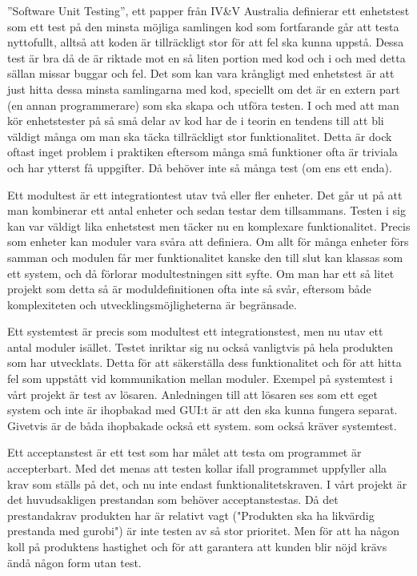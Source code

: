 	''Software Unit Testing'', ett papper från IV\&V Australia definierar ett enhetstest som ett test på den minsta möjliga samlingen kod som fortfarande går att testa nyttofullt, alltså att koden är tillräckligt stor för att fel ska kunna uppstå. Dessa test är bra då de är riktade mot en så liten portion med kod och i och med detta sällan missar buggar och fel. Det som kan vara krångligt med enhetstest är att just hitta dessa minsta samlingarna med kod, speciellt om det är en extern part (en annan programmerare) som ska skapa och utföra testen. I och med att man kör enhetstester på så små delar av kod har de i teorin en tendens till att bli väldigt många om man ska täcka tillräckligt stor funktionalitet. Detta är dock oftast inget problem i praktiken eftersom många små funktioner ofta är triviala och har ytterst få uppgifter. Då behöver inte så många test (om ens ett enda). \newline
	
	Ett modultest är ett integrationtest utav två eller fler enheter. Det går ut på att man kombinerar ett antal enheter och sedan testar dem tillsammans. Testen i sig kan var väldigt lika enhetstest men täcker nu en komplexare funktionalitet. Precis som enheter kan moduler vara svåra att definiera. Om allt för många enheter förs samman och modulen får mer funktionalitet kanske den till slut kan klassas som ett system, och då förlorar modultestningen sitt syfte. Om man har ett så litet projekt som detta så är moduldefinitionen ofta inte så svår, eftersom både komplexiteten och utvecklingsmöjligheterna är begränsade. \newline
	
	Ett systemtest är precis som modultest ett integrationstest, men nu utav ett antal moduler isället. Testet inriktar sig nu också vanligtvis på hela produkten som har utvecklats. Detta för att säkerställa dess funktionalitet och för att hitta fel som uppstått vid kommunikation mellan moduler. Exempel på systemtest i vårt projekt är test av lösaren. Anledningen till att lösaren ses som ett eget system och inte är ihopbakad med GUI:t är att den ska kunna fungera separat. Givetvis är de båda ihopbakade också ett system. som också kräver systemtest. \newline	
	
	Ett acceptanstest är ett test som har målet att testa om programmet är accepterbart. Med det menas att testen kollar ifall programmet uppfyller alla krav som ställs på det, och nu inte endast funktionalitetskraven. I vårt projekt är det huvudsakligen prestandan som behöver acceptanstestas. Då det prestandakrav produkten har är relativt vagt ("Produkten ska ha likvärdig prestanda med gurobi") är inte testen av så stor prioritet. Men för att ha någon koll på produktens hastighet och för att garantera att kunden blir nöjd krävs ändå någon form utan test.  \newline
	

